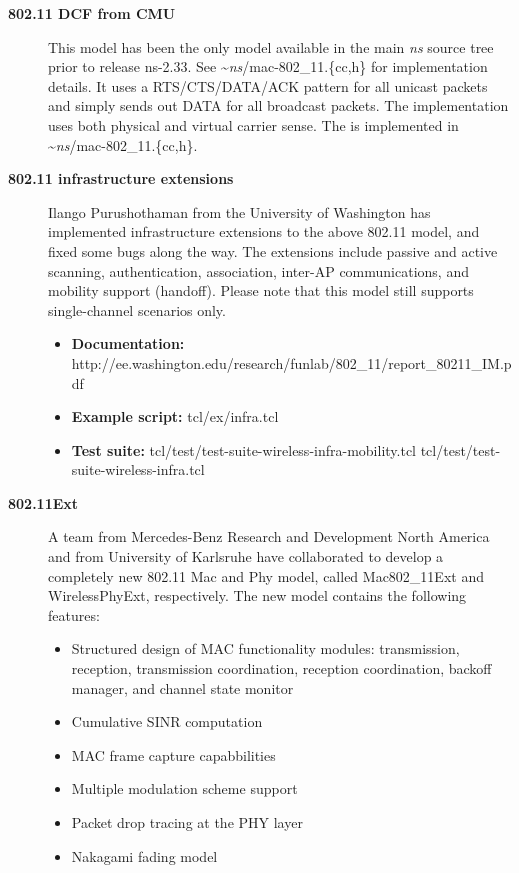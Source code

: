 \begin{description}
\item[{\bf 802.11 DCF from CMU}] 
  This model has been the only model available in the main \emph{ns} source
  tree prior to release ns-2.33.  See \textasciitilde\emph{ns}/{mac-802\_11.\{cc,h\}} for 
  implementation details.  It uses a 
  RTS/CTS/DATA/ACK pattern for all unicast packets and simply sends out
  DATA for all broadcast packets. The implementation uses both 
  physical and virtual carrier sense. The
   is implemented in
  \textasciitilde\emph{ns}/{mac-802\_11.\{cc,h\}}.
\item[{\bf 802.11 infrastructure extensions}] 
  Ilango Purushothaman from the University of Washington has implemented
  infrastructure extensions to the above 802.11 model, and fixed some bugs
  along the way.  The extensions include passive and active scanning,
  authentication, association, inter-AP communications, and mobility
  support (handoff).  Please note that this model still supports
  single-channel scenarios only. 
\begin{itemize}
\item {\bf Documentation:} http://ee.washington.edu/research/funlab/802\_11/report\_80211\_IM.pdf
\item {\bf Example script:} tcl/ex/infra.tcl 
\item {\bf Test suite:} tcl/test/test-suite-wireless-infra-mobility.tcl tcl/test/test-suite-wireless-infra.tcl
\end{itemize}
\item[{\bf 802.11Ext}]  
  A team from Mercedes-Benz Research and Development North America and
  from University of Karlsruhe have collaborated to develop a completely
  new 802.11 Mac and Phy model, called Mac802\_11Ext and WirelessPhyExt,
  respectively.  The new model contains the following features:
\begin{itemize}
\item Structured design of MAC functionality modules:  transmission, 
reception, transmission coordination, reception coordination, backoff
manager, and channel state monitor
\item Cumulative SINR computation
\item MAC frame capture capabbilities
\item Multiple modulation scheme support
\item Packet drop tracing at the PHY layer
\item Nakagami fading model
\end{itemize}

\end{description}
